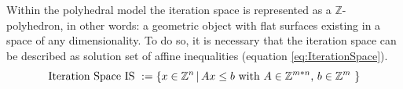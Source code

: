 


  


Within the polyhedral model the iteration space is represented as a $\mathbb{Z}$-polyhedron,
in other words: a geometric object with flat surfaces existing in a space of any
dimensionality. To do so, it is necessary that the iteration space 
can be described as solution set of affine inequalities
(equation \ref{eq:IterationSpace}).
\begin{equation}
  \text{Iteration Space IS } := \{ x \in \mathbb{Z}^n \, |\, Ax\leq b \text{ with $A\in\mathbb{Z}^{m*n} $, $ b\in\mathbb{Z}^{m}$  } \} \label{eq:IterationSpace}
\end{equation}

